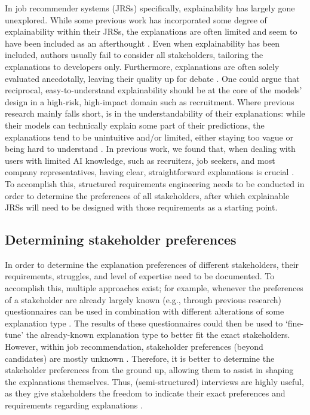 In job recommender systems (JRSs) specifically, explainability has largely gone unexplored. While some previous work has incorporated some degree of explainability within their JRSs, the explanations are often limited and seem to have been included as an afterthought \cite{le2019towards,Upadhyay2021,yildirim2021bideepfm}. Even when explainability has been included, authors usually fail to consider all stakeholders, tailoring the explanations to developers only. Furthermore, explanations are often solely evaluated anecdotally, leaving their quality up for debate \cite{nauta2022anecdotal}. One could argue that reciprocal, easy-to-understand explainability should be at the core of the models' design in a high-risk, high-impact domain such as recruitment. Where previous research mainly falls short, is in the understandability of their explanations: while their models can technically explain some part of their predictions, the explanations tend to be unintuitive and/or limited, either staying too vague \cite{le2019towards,Upadhyay2021} or being hard to understand \cite{yildirim2021bideepfm}. In previous work, we found that, when dealing with users with limited AI knowledge, such as recruiters, job seekers, and most company representatives, having clear, straightforward explanations is crucial \cite{schellingerhout2022explainable,szymanski2021visual}. To accomplish this, structured requirements engineering needs to be conducted in order to determine the preferences of all stakeholders, after which explainable JRSs will need to be designed with those requirements as a starting point. 

\subsection{Determining stakeholder preferences}
In order to determine the explanation preferences of different stakeholders, their requirements, struggles, and level of expertise need to be documented. To accomplish this, multiple approaches exist; for example, whenever the preferences of a stakeholder are already largely known (e.g., through previous research) questionnaires can be used in combination with different alterations of some explanation type \cite{szymanski2021visual}. The results of these questionnaires could then be used to `fine-tune' the already-known explanation type to better fit the exact stakeholders. However, within job recommendation, stakeholder preferences (beyond candidates) are mostly unknown \cite{de2021job}. Therefore, it is better to determine the stakeholder preferences from the ground up, allowing them to assist in shaping the explanations themselves. Thus, (semi-structured) interviews are highly useful, as they give stakeholders the freedom to indicate their exact preferences and requirements regarding explanations \cite{longhurst2003semi}. 

